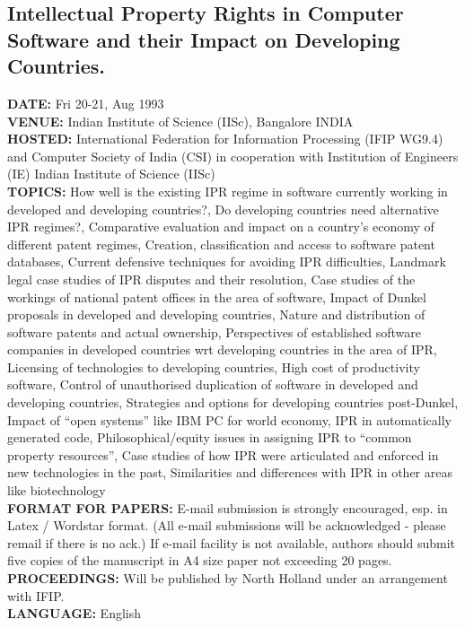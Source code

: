 \subsection{Intellectual Property Rights in Computer Software
and their Impact on Developing Countries.}
{\bf DATE:} Fri 20-21, Aug 1993\\
{\bf VENUE:}  Indian Institute of Science (IISc), Bangalore INDIA\\
{\bf HOSTED:} International Federation for Information Processing
(IFIP WG9.4) and Computer Society of India (CSI) in cooperation with
Institution of Engineers (IE) Indian Institute of Science (IISc)  \\
{\bf TOPICS:} How well is the existing IPR regime in software
currently working in developed and developing countries?, Do
developing countries need alternative IPR regimes?, Comparative
evaluation and impact on a country's economy of different patent
regimes, Creation, classification and access to software patent
databases, Current defensive techniques for avoiding IPR difficulties,
Landmark legal case studies of IPR disputes and their resolution, Case
studies of the workings of national patent offices in the area of
software, Impact of Dunkel proposals in developed and developing
countries, Nature and distribution of software patents and actual
ownership, Perspectives of established software companies in developed
countries wrt developing countries in the area of IPR, Licensing of
technologies to developing countries, High cost of productivity
software, Control of unauthorised duplication of software in developed
and developing countries, Strategies and options for developing
countries post-Dunkel, Impact of ``open systems'' like IBM PC for
world economy, IPR in automatically generated code,
Philosophical/equity issues in assigning IPR to ``common property
resources'', Case studies of how IPR were articulated and enforced in
new technologies in the past, Similarities and differences with IPR in
other areas like biotechnology    \\
{\bf FORMAT FOR PAPERS:} E-mail submission is strongly encouraged, esp. in
Latex / Wordstar  format.  (All e-mail submissions will be
acknowledged - please remail if there is no ack.) If e-mail facility
is not available, authors should submit five copies of the manuscript
in A4 size paper not exceeding 20 pages.\\
{\bf PROCEEDINGS:} Will be published by North Holland under an
arrangement with IFIP. \\
{\bf LANGUAGE:} English\\
